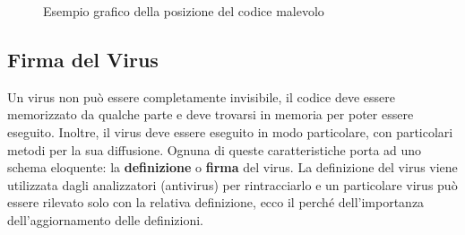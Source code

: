 \begin{figure}[htpb]
\centering
{}
		\caption{Esempio grafico della posizione del codice malevolo \label{fig:virus_posizione_codice}}  
\end{figure}

\subsection{Firma del Virus}
Un virus non può essere completamente invisibile, il codice deve essere memorizzato da qualche parte e deve trovarsi in memoria per poter essere eseguito. Inoltre, il virus deve essere eseguito in modo particolare, con particolari metodi per la sua diffusione.
Ognuna di queste caratteristiche porta ad uno schema eloquente: la \textbf{definizione} o \textbf{firma} del virus.
La definizione del virus viene utilizzata dagli analizzatori (antivirus) per rintracciarlo e un particolare virus può essere rilevato solo con la relativa definizione, ecco il perché dell'importanza dell'aggiornamento delle definizioni.
